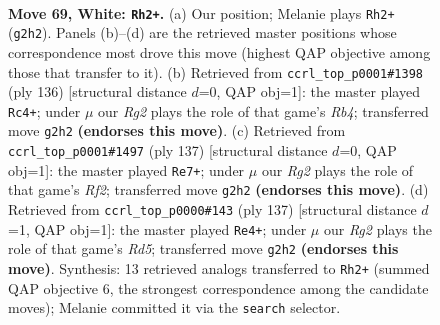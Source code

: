 \documentclass[11pt]{article}
\begin{document}
\clearpage

\begin{figure}[p]\centering
\begin{subfigure}{0.46\textwidth}\centering
\resizebox{\linewidth}{!}{%
\newchessgame
\chessboard[
  setfen={7k/8/2r5/8/8/8/6R1/4K3 w - - 18 69},
  showmover=false,
  pgfstyle=straightmove, color=movearrow, markmove={g2-h2}
]}
\caption{}
\end{subfigure}\hfill
\begin{subfigure}{0.46\textwidth}\centering
\resizebox{\linewidth}{!}{%
\newchessgame
\chessboard[
  setfen={2k5/8/7r/8/1R6/8/8/3K4 w - - 15 69},
  showmover=false,
  pgfstyle=straightmove, color=movearrow, markmove={b4-c4}
]}
\caption{}
\end{subfigure}
\\[4pt]
\begin{subfigure}{0.46\textwidth}\centering
\resizebox{\linewidth}{!}{%
\newchessgame
\chessboard[
  setfen={2R5/5r2/8/8/6k1/8/8/4K3 b - - 18 69},
  showmover=false,
  pgfstyle=straightmove, color=movearrow, markmove={f7-e7}
]}
\caption{}
\end{subfigure}\hfill
\begin{subfigure}{0.46\textwidth}\centering
\resizebox{\linewidth}{!}{%
\newchessgame
\chessboard[
  setfen={8/8/1R6/6k1/3r4/8/4K3/8 b - - 8 69},
  showmover=false,
  pgfstyle=straightmove, color=movearrow, markmove={d4-e4}
]}
\caption{}
\end{subfigure}
\caption{\textbf{Move 69, White: \texttt{Rh2+}.} (a) Our position; Melanie plays \texttt{Rh2+} (\texttt{g2h2}). Panels (b)--(d) are the retrieved master positions whose correspondence most drove this move (highest QAP objective among those that transfer to it). (b) Retrieved from \texttt{ccrl\_top\_p0001\#1398} (ply 136) [structural distance $d$=0, QAP obj=1]: the master played \texttt{Rc4+}; under $\mu$ our \emph{Rg2} plays the role of that game's \emph{Rb4}; transferred move \texttt{g2h2} \textbf{(endorses this move)}. (c) Retrieved from \texttt{ccrl\_top\_p0001\#1497} (ply 137) [structural distance $d$=0, QAP obj=1]: the master played \texttt{Re7+}; under $\mu$ our \emph{Rg2} plays the role of that game's \emph{Rf2}; transferred move \texttt{g2h2} \textbf{(endorses this move)}. (d) Retrieved from \texttt{ccrl\_top\_p0000\#143} (ply 137) [structural distance $d$=1, QAP obj=1]: the master played \texttt{Re4+}; under $\mu$ our \emph{Rg2} plays the role of that game's \emph{Rd5}; transferred move \texttt{g2h2} \textbf{(endorses this move)}. Synthesis: 13 retrieved analogs transferred to \texttt{Rh2+} (summed QAP objective 6, the strongest correspondence among the candidate moves); Melanie committed it via the \texttt{search} selector.}
\label{fig:thought-m136}
\end{figure}
\end{document}
